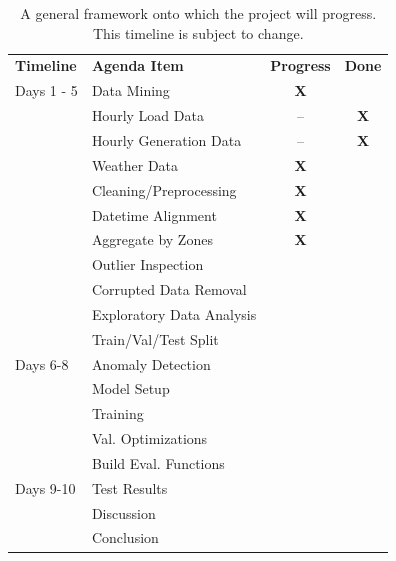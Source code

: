 \documentclass[sigconf]{acmart}
\begin{document}
\begin{table}[hbt!]
\centering
\caption{A general framework onto which the project will progress. This timeline is subject to change.}
\begin{tabular}{ll | c | c}
\toprule
\textbf{Timeline} & \textbf{Agenda Item} & \hfil \textbf{Progress} & \hfil \textbf{Done} \\
\cmidrule(rl){1-1}\cmidrule(rl){2-2}\cmidrule(rl){3-3}\cmidrule(rl){4-4}
  Days 1 - 5 & Data Mining & \textbf{X} & \\
  \cmidrule(rl){1-4}
   & \hspace{3mm}Hourly Load Data & -- & \textbf{X} \\   
   & \hspace{3mm}Hourly Generation Data & -- & \textbf{X} \\   
   & \hspace{3mm}Weather Data & \textbf{X} & \\   
   & Cleaning/Preprocessing & \textbf{X} & \\  
   \cmidrule(rl){2-4} 
   & \hspace{3mm}Datetime Alignment & \textbf{X} & \\   
   & \hspace{3mm}Aggregate by Zones & \textbf{X} & \\   
   & \hspace{3mm}Outlier Inspection & & \\   
   & \hspace{3mm}Corrupted Data Removal & & \\  
   & Exploratory Data Analysis & & \\  
   \cmidrule(rl){2-4} 
   & Train/Val/Test Split & & \\  
   \cmidrule(rl){2-4} 
  Days 6-8 & Anomaly Detection & & \\  
   \cmidrule(rl){1-4} 
   & Model Setup & & \\  
   \cmidrule(rl){2-4} 
   & \hspace{3mm}Training & & \\  
   & \hspace{3mm}Val. Optimizations & & \\  
   & Build Eval. Functions & & \\  
   \cmidrule(rl){2-4} 
  Days 9-10 & Test Results & & \\  
  \cmidrule(rl){1-4} 
   & Discussion & & \\
   \cmidrule(rl){2-4}   
   & Conclusion & & \\  
   \cmidrule(rl){2-4} 
  \bottomrule
\end{tabular}
\end{table}
\end{document}
